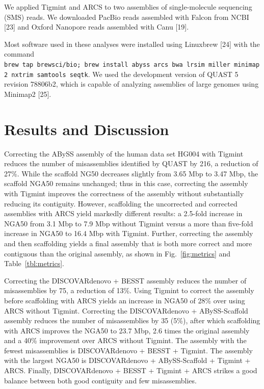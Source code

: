 \documentclass{bmcart}
\begin{document}
We applied Tigmint and ARCS to two assemblies of single-molecule sequencing (SMS) reads. We downloaded PacBio reads assembled with Falcon from NCBI {[}23{]} and Oxford Nanopore reads assembled with Canu {[}19{]}.

Most software used in these analyses were installed using Linuxbrew {[}24{]} with the command \texttt{brew\ tap\ brewsci/bio;\ brew\ install\ abyss\ arcs\ bwa\ lrsim\ miller\ minimap2\ nxtrim\ samtools\ seqtk}. We used the development version of QUAST 5 revision 78806b2, which is capable of analyzing assemblies of large genomes using Minimap2 {[}25{]}.

\hypertarget{results-and-discussion}{%
\section*{Results and Discussion}\label{results-and-discussion}}

Correcting the ABySS assembly of the human data set HG004 with Tigmint reduces the number of misassemblies identified by QUAST by 216, a reduction of 27\%. While the scaffold NG50 decreases slightly from 3.65 Mbp to 3.47 Mbp, the scaffold NGA50 remains unchanged; thus in this case, correcting the assembly with Tigmint improves the correctness of the assembly without substantially reducing its contiguity. However, scaffolding the uncorrected and corrected assemblies with ARCS yield markedly different results: a 2.5-fold increase in NGA50 from 3.1 Mbp to 7.9 Mbp without Tigmint versus a more than five-fold increase in NGA50 to 16.4 Mbp with Tigmint. Further, correcting the assembly and then scaffolding yields a final assembly that is both more correct and more contiguous than the original assembly, as shown in Fig.~\ref{fig:metrics} and Table~\ref{tbl:metrics}.

Correcting the DISCOVARdenovo + BESST assembly reduces the number of misassemblies by 75, a reduction of 13\%. Using Tigmint to correct the assembly before scaffolding with ARCS yields an increase in NGA50 of 28\% over using ARCS without Tigmint. Correcting the DISCOVARdenovo + ABySS-Scaffold assembly reduces the number of misassemblies by 35 (5\%), after which scaffolding with ARCS improves the NGA50 to 23.7 Mbp, 2.6 times the original assembly and a 40\% improvement over ARCS without Tigmint. The assembly with the fewest misassemblies is DISCOVARdenovo + BESST + Tigmint. The assembly with the largest NGA50 is DISCOVARdenovo + ABySS-Scaffold + Tigmint + ARCS. Finally, DISCOVARdenovo + BESST + Tigmint + ARCS strikes a good balance between both good contiguity and few misassemblies.
\end{document}
